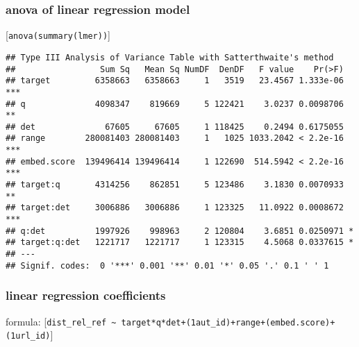 \documentclass[
  12pt,
  oneside]{book}
\begin{document}
\subsubsection{anova of linear regression model}\label{anova-of-linear-regression-model-3}

{[}\texttt{anova(summary(lmer))}{]}

\begin{verbatim}
## Type III Analysis of Variance Table with Satterthwaite's method
##                 Sum Sq   Mean Sq NumDF  DenDF   F value    Pr(>F)    
## target         6358663   6358663     1   3519   23.4567 1.333e-06 ***
## q              4098347    819669     5 122421    3.0237 0.0098706 ** 
## det              67605     67605     1 118425    0.2494 0.6175055    
## range        280081403 280081403     1   1025 1033.2042 < 2.2e-16 ***
## embed.score  139496414 139496414     1 122690  514.5942 < 2.2e-16 ***
## target:q       4314256    862851     5 123486    3.1830 0.0070933 ** 
## target:det     3006886   3006886     1 123325   11.0922 0.0008672 ***
## q:det          1997926    998963     2 120804    3.6851 0.0250971 *  
## target:q:det   1221717   1221717     1 123315    4.5068 0.0337615 *  
## ---
## Signif. codes:  0 '***' 0.001 '**' 0.01 '*' 0.05 '.' 0.1 ' ' 1
\end{verbatim}

\subsubsection{linear regression coefficients}\label{linear-regression-coefficients-3}

formula: {[}\texttt{dist\_rel\_ref\ \textasciitilde{}\ target*q*det+(1\textbar{}aut\_id)+range+(embed.score)+(1\textbar{}url\_id)}{]}
\end{document}
